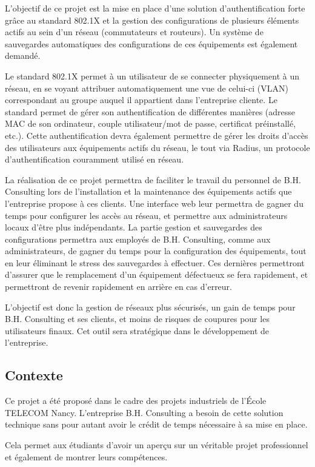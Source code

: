 L'objectif de ce projet est la mise en place d'une solution d'authentification forte grâce au standard 802.1X et la gestion des configurations de plusieurs éléments actifs au sein d'un réseau (commutateurs et routeurs). Un système de sauvegardes automatiques des configurations de ces équipements est également demandé.

Le standard 802.1X permet à un utilisateur de se connecter physiquement à un réseau, en se voyant attribuer automatiquement une vue de celui-ci (VLAN) correspondant au groupe auquel il appartient dans l'entreprise cliente. Le standard permet de gérer son authentification de différentes manières (adresse MAC de son ordinateur, couple utilisateur/mot de passe, certificat préinstallé, etc.). Cette authentification devra également permettre de gérer les droits d'accès des utilisateurs aux équipements actifs du réseau, le tout via Radius, un protocole d'authentification couramment utilisé en réseau.

La réalisation de ce projet permettra de faciliter le travail du personnel de B.H. Consulting lors de l'installation et la maintenance des équipements actifs que l'entreprise propose à ces clients. Une interface web leur permettra de gagner du temps pour configurer les accès au réseau, et permettre aux administrateurs locaux d'être plus indépendants. La partie gestion et sauvegardes des configurations permettra aux employés de B.H. Consulting, comme aux administrateurs, de gagner du temps pour la configuration des équipements, tout en leur éliminant le stress des sauvegardes à effectuer. Ces dernières permettront d'assurer que le remplacement d'un équipement défectueux se fera rapidement, et permettront de revenir rapidement en arrière en cas d'erreur.

L'objectif est donc la gestion de réseaux plus sécurisés, un gain de temps pour B.H. Consulting et ses clients, et moins de risques de coupures pour les utilisateurs finaux. Cet outil sera stratégique dans le développement de l'entreprise.

\subsection{Contexte}

Ce projet a été proposé dans le cadre des projets industriels de l'École TELECOM Nancy. L'entreprise B.H. Consulting a besoin de cette solution technique sans pour autant avoir le crédit de temps nécessaire à sa mise en place.

Cela permet aux étudiants d'avoir un aperçu sur un véritable projet professionnel et également de montrer leurs compétences.

